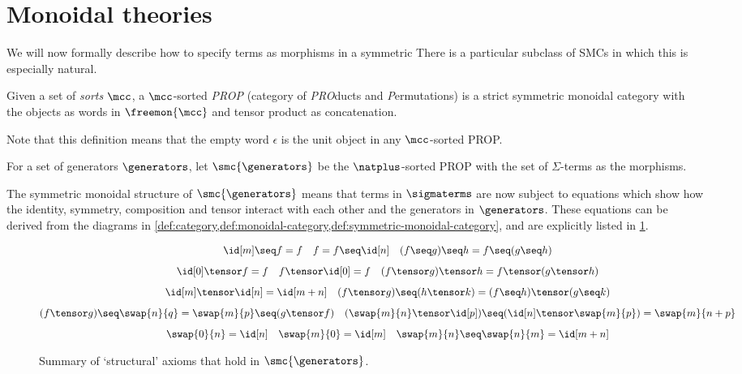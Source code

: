 \section{Monoidal theories}

We will now formally describe how to specify terms as morphisms in a symmetric
There is a particular subclass of SMCs in which this is especially natural.

\begin{definition}
    Given a set of \emph{sorts} \(\mcc\), a \(\mcc\)-sorted \emph{PROP}
    (category of \emph{PRO}ducts and \emph{P}ermutations) is a strict symmetric
    monoidal category with the objects as words in \(\freemon{\mcc}\) and tensor
    product as concatenation.
\end{definition}

Note that this definition means that the empty word \(\epsilon\) is the unit
object in any \(\mcc\)-sorted PROP.

\begin{definition}
    For a set of generators \(\generators\), let \(\smc{\generators}\) be the
    \(\natplus\)-sorted PROP with the set of \(\Sigma\)-terms as the morphisms.
\end{definition}

The symmetric monoidal structure of \(\smc{\generators}\) means that terms
in \(\sigmaterms\) are now subject to equations which show how the identity,
symmetry, composition and tensor interact with each other and the generators in
\(\generators\).
These equations can be derived from the diagrams in
\cref{def:category,def:monoidal-category,def:symmetric-monoidal-category}, and
are explicitly listed in \cref{fig:structural-equations}.

\begin{figure}
    \centering
    \begin{gather*}
        \id[m] \seq  f = f
        \quad
        f = f \seq \id[n]
        \quad
        (f \seq g) \seq h = f \seq (g \seq h)
        \\[0.5em]
        \id[0] \tensor f = f
        \quad
        f \tensor \id[0] = f
        \quad
        (f \tensor g) \tensor h = f \tensor (g \tensor h)
        \\[0.5em]
        \id[m] \tensor \id[n] = \id[m+n]
        \quad
        (f \tensor g) \seq (h \tensor k) = (f \seq h) \tensor (g \seq k)
        \\[0.5em]
        (f \tensor g) \seq \swap{n}{q} = \swap{m}{p} \seq (g \tensor f)
        \quad
        (\swap{m}{n} \tensor \id[p]) \seq (\id[n] \tensor \swap{m}{p}) = \swap{m}{n+p}
        \\[0.5em]
        \swap{0}{n} = \id[n]
        \quad
        \swap{m}{0} = \id[m]
        \quad
        \swap{m}{n} \seq \swap{n}{m} = \id[m+n]
    \end{gather*}
    \caption{Summary of `structural' axioms that hold in \(\smc{\generators}\).}
    \label{fig:structural-equations}
\end{figure}

